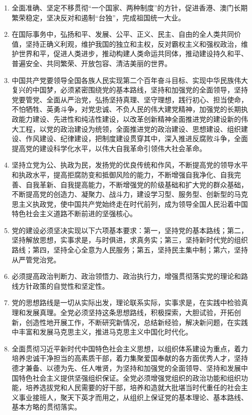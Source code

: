 \documentclass[UTF8,11pt,a4paper]{ctexart}
\begin{document}
\begin{enumerate}[label=\arabic*., leftmargin=2.3em]
\item 全面准确、坚定不移贯彻“一个国家、两种制度”的方针，促进香港、澳门长期繁荣稳定，坚决反对和遏制“台独”，完成祖国统一大业。
\item 在国际事务中，弘扬和平、发展、公平、正义、民主、自由的全人类共同价值，坚持正确义利观，维护我国的独立和主权，反对霸权主义和强权政治，维护世界和平，促进人类进步，推动构建人类命运共同体，推动建设持久和平、普遍安全、共同繁荣、开放包容、清洁美丽的世界。
\item 中国共产党要领导全国各族人民实现第二个百年奋斗目标、实现中华民族伟大复兴的中国梦，必须紧密围绕党的基本路线，坚持和加强党的全面领导，坚持党要管党、全面从严治党，弘扬坚持真理、坚守理想，践行初心、担当使命，不怕牺牲、英勇斗争，对党忠诚、不负人民的伟大建党精神，加强党的长期执政能力建设、先进性和纯洁性建设，以改革创新精神全面推进党的建设新的伟大工程，以党的政治建设为统领，全面推进党的政治建设、思想建设、组织建设、作风建设、纪律建设，把制度建设贯穿其中，深入推进反腐败斗争，全面提高党的建设科学化水平，以伟大自我革命引领伟大社会革命。
\item 坚持立党为公、执政为民，发扬党的优良传统和作风，不断提高党的领导水平和执政水平，提高拒腐防变和抵御风险的能力，不断增强自我净化、自我完善、自我革新、自我提高能力，不断增强党的阶级基础和扩大党的群众基础，不断提高党的创造力、凝聚力、战斗力，建设学习型、服务型、创新型的马克思主义执政党，使中国共产党始终走在时代前列，成为领导全国人民沿着中国特色社会主义道路不断前进的坚强核心。
\item 党的建设必须坚决实现以下六项基本要求：第一，坚持党的基本路线；第二，坚持解放思想，实事求是，与时俱进，求真务实；第三，坚持新时代党的组织路线；第四，坚持全心全意为人民服务；第五，坚持民主集中制；第六，坚持从严管党治党。
\item 必须提高政治判断力、政治领悟力、政治执行力，增强贯彻落实党的理论和路线方针政策的自觉性和坚定性。
\item 党的思想路线是一切从实际出发，理论联系实际，实事求是，在实践中检验真理和发展真理。全党必须坚持这条思想路线，积极探索，大胆试验，开拓创新，创造性地开展工作，不断研究新情况，总结新经验，解决新问题，在实践中丰富和发展马克思主义，推进马克思主义中国化时代化。
\item 全面贯彻习近平新时代中国特色社会主义思想，以组织体系建设为重点，着力培养忠诚干净担当的高素质干部，着力集聚爱国奉献的各方面优秀人才，坚持德才兼备、以德为先、任人唯贤，为坚持和加强党的全面领导、坚持和发展中国特色社会主义提供坚强组织保证。全党必须增强党组织的政治功能和组织功能，培养选拔党和人民需要的好干部，培养和造就大批堪当时代重任的社会主义事业接班人，聚天下英才而用之，从组织上保证党的基本理论、基本路线、基本方略的贯彻落实。

\end{enumerate}
\end{document}
